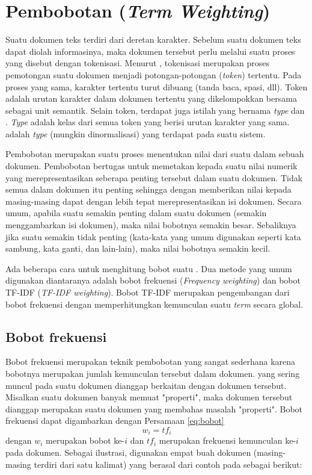 \section{Pembobotan \Term (\textit{Term Weighting})}
\label{sec:termWeight}
Suatu dokumen teks terdiri dari deretan karakter. Sebelum suatu dokumen teks dapat diolah informasinya, maka dokumen tersebut perlu melalui suatu proses yang disebut dengan tokenisasi. Menurut \cite{schutze2008introduction}, tokenisasi merupakan proses pemotongan suatu dokumen menjadi potongan-potongan (\textit{token}) tertentu. Pada proses yang sama, karakter tertentu turut dibuang (tanda baca, spasi, dll). Token adalah urutan karakter dalam dokumen tertentu yang dikelompokkan bersama sebagai unit semantik. Selain token, terdapat juga istilah yang bernama \textit{type} dan \term. \textit{Type} adalah kelas dari semua token yang berisi urutan karakter yang sama. \Term adalah \textit{type} (mungkin dinormalisasi) yang terdapat pada suatu sistem.

Pembobotan \term merupakan suatu proses menentukan nilai dari suatu \term dalam sebuah dokumen. Pembobotan \term bertugas untuk memetakan \term kepada suatu nilai numerik yang merepresentasikan seberapa penting \term tersebut dalam suatu dokumen. Tidak semua \term dalam dokumen itu penting sehingga dengan memberikan nilai kepada masing-masing \term dapat dengan lebih tepat merepresentasikan isi dokumen. Secara umum, apabila suatu \term semakin penting dalam suatu dokumen (semakin menggambarkan isi dokumen), maka nilai bobotnya semakin besar. Sebaliknya jika suatu \term semakin tidak penting (kata-kata yang umum digunakan seperti kata sambung, kata ganti, dan lain-lain), maka nilai bobotnya semakin kecil.

Ada beberapa cara untuk menghitung bobot suatu \term. Dua metode yang umum digunakan diantaranya adalah bobot frekuensi (\textit{Frequency weighting}) dan bobot TF-IDF (\textit{TF-IDF weighting}). Bobot TF-IDF merupakan pengembangan dari bobot frekuensi dengan memperhitungkan kemunculan suatu \textit{term} secara global.

\subsection{Bobot frekuensi}
\label{sub:freq}
Bobot frekuensi merupakan teknik pembobotan yang sangat sederhana karena bobotnya merupakan jumlah kemunculan \term tersebut dalam dokumen. \Term yang sering muncul pada suatu dokumen dianggap berkaitan dengan dokumen tersebut. Misalkan suatu dokumen banyak memuat \term "properti", maka dokumen tersebut dianggap merupakan suatu dokumen yang membahas masalah "properti". Bobot frekuensi dapat digambarkan dengan Persamaan \ref{eq:bobot}
\begin{equation}
\label{eq:bobot}
w_i=tf_i
\end{equation}
dengan $w_i$ merupakan bobot \term ke-$i$ dan $tf_i$ merupakan frekuensi kemunculan \term ke-$i$ pada dokumen. Sebagai ilustrasi, digunakan empat buah dokumen (masing-masing terdiri dari satu kalimat) yang berasal dari contoh pada \cite{schutze2008introduction} sebagai berikut:

